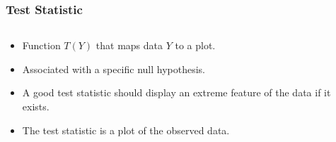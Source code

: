 \documentclass{beamer}
\begin{document}


\begin{frame}
  \frametitle{Test Statistic}
  
	\begin{columns}
	
		\begin{column}{0.4\textwidth}
		  \begin{itemize}
			  \item Function $T(Y)$ that maps data $Y$ to a plot.
			  \item Associated with a specific null hypothesis.
			  \item A good test statistic should display an extreme feature of the data if it exists.
			  \item The test statistic is a plot of the observed data.		
		 \end{itemize}		
		\end{column}
		
		\begin{column}{0.6\textwidth}
			 \begin{center}  \end{center}
		\end{column}
		
	\end{columns} 
	
\end{frame}
\end{document}
